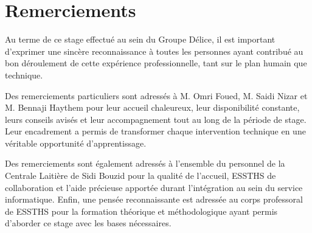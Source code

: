 \documentclass[12pt,a4paper,oneside]{report}
\begin{document}
\chapter*{Remerciements}
Au terme de ce stage effectué au sein du Groupe Délice, il est important d'exprimer une sincère reconnaissance à toutes les personnes ayant contribué au bon déroulement de cette expérience professionnelle, tant sur le plan humain que technique.

Des remerciements particuliers sont adressés à M. Omri Foued, M. Saidi Nizar et M. Bennaji Haythem pour leur accueil chaleureux, leur disponibilité constante, leurs conseils avisés et leur accompagnement tout au long de la période de stage. Leur encadrement a permis de transformer chaque intervention technique en une véritable opportunité d'apprentissage.

Des remerciements sont également adressés à l'ensemble du personnel de la Centrale Laitière de Sidi Bouzid pour la qualité de l'accueil, ESSTHS de collaboration et l'aide précieuse apportée durant l'intégration au sein du service informatique. Enfin, une pensée reconnaissante est adressée au corps professoral de ESSTHS pour la formation théorique et méthodologique ayant permis d'aborder ce stage avec les bases nécessaires.

\clearpage\tableofcontents\clearpage\listoffigures\listoftables\clearpage
\end{document}

